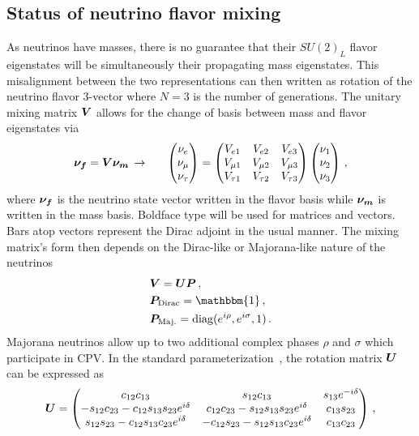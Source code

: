 \subsection{Status of neutrino flavor mixing}
\label{sec:numass}
\noindent As neutrinos have masses, there is no guarantee that their $SU(2)_{L}$ flavor eigenstates will be simultaneously their propagating mass eigenstates. This misalignment between the two representations can then written as rotation of the neutrino flavor 3-vector where $N=3$ is the number of generations. The unitary mixing matrix $\boldsymbol{V}$ allows for the change of basis between mass and flavor eigenstates via
\begin{alignat}{1}
	\label{basis:1} \bb{\nu_{f}}=\bb{V}\bb{\nu_{m}}\,\rightarrow\indent
	\begin{pmatrix}
		\nu_{e}\\
		\nu_{\mu}\\
		\nu_{\tau}
	\end{pmatrix}=
	\begin{pmatrix}
		V_{e1} & V_{e2} & V_{e3}\\
		V_{\mu1} & V_{\mu2} & V_{\mu3}\\
		V_{\tau1} & V_{\tau2} & V_{\tau3}
	\end{pmatrix}
	\begin{pmatrix}
		\nu_{1}\\
		\nu_{2}\\
		\nu_{3}
	\end{pmatrix}\,,
\end{alignat}
where $\boldsymbol{\nu_{f}}$ is the neutrino state vector written in the flavor basis while $\boldsymbol{\nu_{m}}$ is written in the mass basis. Boldface type will be used for matrices and vectors. Bars atop vectors represent the Dirac adjoint in the usual manner. The mixing matrix's form then depends on the Dirac-like or Majorana-like nature of the neutrinos
\begin{alignat}{1}
	\label{phases:1} &\bb{V} = \bb{U}\bb{P}\,,\\
	\label{phases:2} &\bb{P}_{\rm Dirac} = \mathbbm{1}\,,\\
	\label{phases:3} &\bb{P}_{\rm Maj.} = {\rm diag}(e^{i\rho},e^{i\sigma},1)\,.
\end{alignat}
Majorana neutrinos allow up to two additional complex phases $\rho$ and $\sigma$ which participate in CPV. In the standard parameterization~\citep{Schwartz:2014sze}, the rotation matrix $\boldsymbol{U}$ can be expressed as
\begin{alignat}{1}
	\label{rotation:1} \boldsymbol{U} =
	  \begin{pmatrix}
		  c_{12}c_{13} & s_{12}c_{13} & s_{13}e^{-i\delta}\\
		  -s_{12}c_{23} - c_{12}s_{13}s_{23}e^{i\delta} & c_{12}c_{23} - s_{12}s_{13}s_{23}e^{i\delta} & c_{13}s_{23}\\
		  s_{12}s_{23} - c_{12}s_{13}c_{23}e^{i\delta}& -c_{12}s_{23} - s_{12}s_{13}c_{23}e^{i\delta} & c_{13}c_{23}
	  \end{pmatrix}\,,
\end{alignat}
